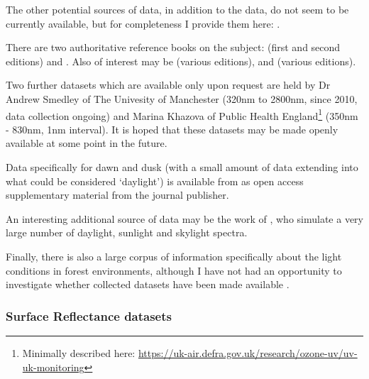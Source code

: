 The other potential sources of data, in addition to the \citet{judd_spectral_1964} data, do not seem to be currently available, but for completeness I provide them here: \citet{condit_spectral_1964, tarrant_spectral_1968, dicarlo_illuminant_2000, taylor_distribution_1941, henderson_spectral_1964, sastri_typical_1968, dixon_spectral_1978, sastri_spectral_1966,williams_statistical_2009,bui_group_2004}.

There are two authoritative reference books on the subject: \citet{henderson_daylight_1970,henderson_daylight_1977} (first and second editions) and \cite{robinson_solar_1966}. Also of interest may be \citet{minnaert_light_1993} (various editions), and \citet{lynch_color_2001} (various editions).

Two further datasets which are available only upon request are held by Dr Andrew Smedley of The Univesity of Manchester (320nm to 2800nm, since 2010, data collection ongoing) and Marina Khazova of Public Health England\footnote{Minimally described here: \url{https://uk-air.defra.gov.uk/research/ozone-uv/uv-uk-monitoring}} (350nm - 830nm, 1nm interval). It is hoped that these datasets may be made openly available at some point in the future.

Data specifically for dawn and dusk (with a small amount of data extending into what could be considered `daylight') is available from \citet{spitschan_variation_2016} as open access supplementary material from the journal publisher. 

An interesting additional source of data may be the work of \citet{peyvandi_colorimetric_2016}, who simulate a very large number of daylight, sunlight and skylight spectra. 

Finally, there is also a large corpus of information specifically about the light conditions in forest environments, although I have not had an opportunity to investigate whether collected datasets have been made available \citep{sumner_catarrhine_2000,chiao_characterization_2000,federer_spectral_1966,geiger_climate_2003,thery_forest_2001,xu_changes_2013,wang_real-time_2006,endler_color_1993,brinkmann_light_1971,de_castro_light_2000,freyman_spectral_1968,fassnacht_review_2016,blackburn_seasonal_1995}.


\subsubsection{Surface Reflectance datasets}
\label{sec:surfs}

